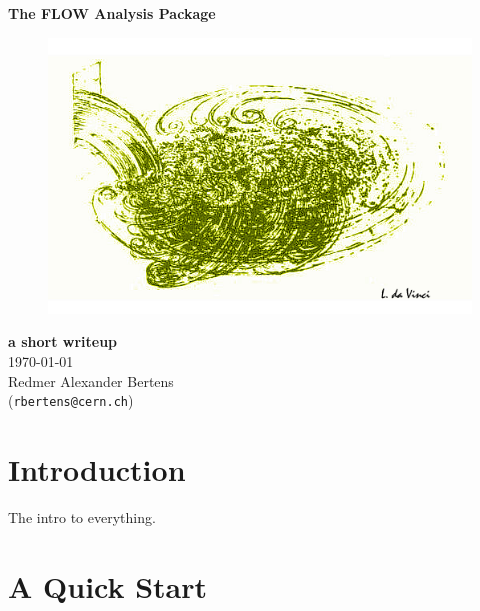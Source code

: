 \documentclass[a4paper]{book}
\numberwithin{equation}{subsection}
\renewcommand{\thefootnote}{\fnsymbol{footnote}}
\begin{document}
\noindent
\begin{center}
	\vspace*{1.5cm}
	{\LARGE \bf The FLOW Analysis Package}\\
		
	\vspace{1.5cm}
	\begin{figure}[hbt]
		\includegraphics[width=1.\textwidth]{figs/daVinci.png}
	\end{figure}
		
	\vspace{1.5cm}
	\noindent
	{\large \bf a short writeup}\\
	\today\\
\vfill
\noindent
Redmer Alexander Bertens \\ (\texttt{rbertens@cern.ch})
\end{center}

\clearpage
\thispagestyle{empty}
\tableofcontents
\renewcommand{\thefootnote}{\alph{footnote}}
\mainmatter
\chapter{Introduction}
The intro to everything.
\chapter{A Quick Start}
\end{document}
